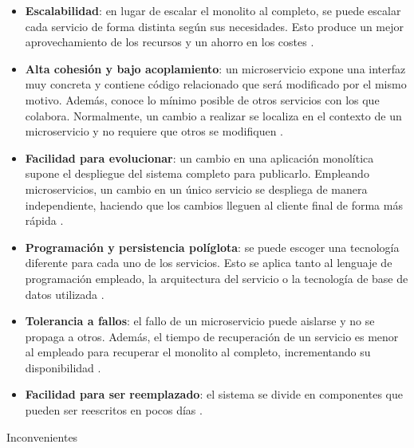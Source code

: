 \documentclass[11pt,spanish,listoffigures]{tfgetsinf}
\begin{document}
\begin{itemize}

\item \textbf{Escalabilidad}: en lugar de escalar el monolito al completo, se puede escalar cada servicio de forma distinta según sus necesidades. Esto produce un mejor aprovechamiento de los recursos y un ahorro en los costes \cite{Newman2015a, DelaTorre2018, Lewis2014}.

\item \textbf{Alta cohesión y bajo acoplamiento}: un microservicio expone una interfaz muy concreta y contiene código relacionado que será modificado por el mismo motivo. Además, conoce lo mínimo posible de otros servicios con los que colabora. Normalmente, un cambio a realizar se localiza en el contexto de un microservicio y no requiere que otros se modifiquen \cite{Newman2015a, DelaTorre2018, Hunter2017}.

\item \textbf{Facilidad para evolucionar}: un cambio en una aplicación monolítica supone el despliegue del sistema completo para publicarlo. Empleando microservicios, un cambio en un único servicio se despliega de manera independiente, haciendo que los cambios lleguen al cliente final de forma más rápida \cite{Newman2015a, DelaTorre2018, Lewis2014, Hunter2017}.

\item \textbf{Programación y persistencia políglota}: se puede escoger una tecnología diferente para cada uno de los servicios. Esto se aplica tanto al lenguaje de programación empleado, la arquitectura del servicio o la tecnología de base de datos utilizada \cite{Newman2015a, DelaTorre2018, Lewis2014, Hunter2017}.

\item \textbf{Tolerancia a fallos}: el fallo de un microservicio puede aislarse y no se propaga a otros. Además, el tiempo de recuperación de un servicio es menor al empleado para recuperar el monolito al completo, incrementando su disponibilidad \cite{Newman2015a, Lewis2014, DelaTorre2018}.

\item \textbf{Facilidad para ser reemplazado}: el sistema se divide en componentes que pueden ser reescritos en pocos días \cite{Newman2015a, Lewis2014}.

\end{itemize}

{\Huge Inconvenientes}
\end{document}
